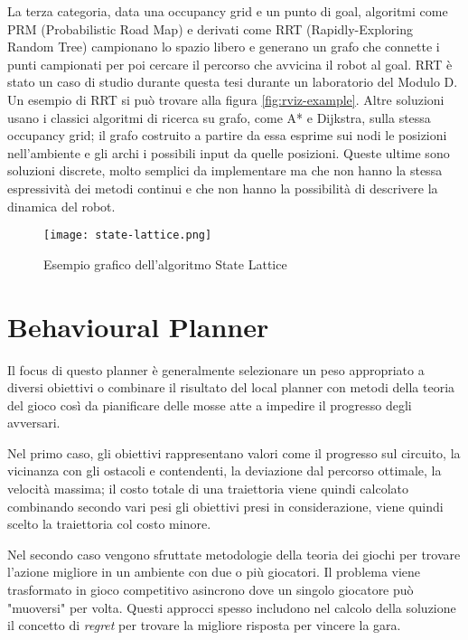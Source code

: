 La terza categoria, data una occupancy grid e un punto di goal, algoritmi come PRM (Probabilistic Road
Map) e derivati come RRT (Rapidly-Exploring Random Tree) campionano lo spazio libero e generano un grafo
che connette i punti campionati per poi cercare il percorso che avvicina il robot al goal. RRT è stato un
caso di studio durante questa tesi durante un laboratorio del Modulo D. Un esempio di RRT si può trovare
alla figura \ref{fig:rviz-example}. Altre soluzioni usano i classici algoritmi di ricerca su grafo, come
A* e Dijkstra, sulla stessa occupancy grid; il grafo costruito a partire da essa esprime sui nodi le posizioni
nell'ambiente e gli archi i possibili input da quelle posizioni. Queste ultime sono soluzioni discrete,
molto semplici da implementare ma che non hanno la stessa espressività dei metodi continui e che non
hanno la possibilità di descrivere la dinamica del robot.

\begin{figure}[h]
	\begin{center}
		\texttt{[image: state-lattice.png]}
	\end{center}
	\caption{Esempio grafico dell'algoritmo State Lattice \cite{state-lattice}}
	\label{fig:state-lattice}
\end{figure}

\section{Behavioural Planner}
Il focus di questo planner è generalmente selezionare un peso appropriato a diversi obiettivi o combinare
il risultato del local planner con metodi della teoria del gioco così da pianificare delle mosse atte a
impedire il progresso degli avversari.

Nel primo caso, gli obiettivi rappresentano valori come il progresso sul circuito, la vicinanza con gli
ostacoli e contendenti, la deviazione dal percorso ottimale, la velocità massima; il costo totale di una
traiettoria viene quindi calcolato combinando secondo vari pesi gli obiettivi presi in considerazione,
viene quindi scelto la traiettoria col costo minore.

Nel secondo caso vengono sfruttate metodologie della teoria dei giochi per trovare l'azione migliore in
un ambiente con due o più giocatori. Il problema viene trasformato in gioco competitivo asincrono dove un
singolo giocatore può "muoversi" per volta. Questi approcci spesso includono nel calcolo della soluzione il
concetto di \textit{regret} per trovare la migliore risposta per vincere la gara.

